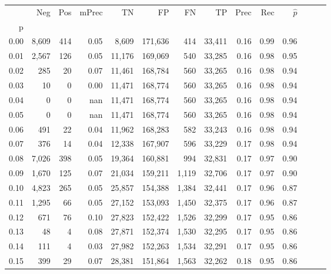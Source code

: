 \begin{tabular}{rrrrrrrrrrrrrr}
\toprule
{} &     Neg &    Pos & mPrec &       TN &       FP &      FN &      TP &  Prec &   Rec & $\hat{p}$ \\
p    &         &        &       &          &          &         &         &       &       &           \\
\midrule
0.00 &   8,609 &    414 &  0.05 &    8,609 &  171,636 &     414 &  33,411 &  0.16 &  0.99 &      0.96 \\
0.01 &   2,567 &    126 &  0.05 &   11,176 &  169,069 &     540 &  33,285 &  0.16 &  0.98 &      0.95 \\
0.02 &     285 &     20 &  0.07 &   11,461 &  168,784 &     560 &  33,265 &  0.16 &  0.98 &      0.94 \\
0.03 &      10 &      0 &  0.00 &   11,471 &  168,774 &     560 &  33,265 &  0.16 &  0.98 &      0.94 \\
0.04 &       0 &      0 &   nan &   11,471 &  168,774 &     560 &  33,265 &  0.16 &  0.98 &      0.94 \\
0.05 &       0 &      0 &   nan &   11,471 &  168,774 &     560 &  33,265 &  0.16 &  0.98 &      0.94 \\
0.06 &     491 &     22 &  0.04 &   11,962 &  168,283 &     582 &  33,243 &  0.16 &  0.98 &      0.94 \\
0.07 &     376 &     14 &  0.04 &   12,338 &  167,907 &     596 &  33,229 &  0.17 &  0.98 &      0.94 \\
0.08 &   7,026 &    398 &  0.05 &   19,364 &  160,881 &     994 &  32,831 &  0.17 &  0.97 &      0.90 \\
0.09 &   1,670 &    125 &  0.07 &   21,034 &  159,211 &   1,119 &  32,706 &  0.17 &  0.97 &      0.90 \\
0.10 &   4,823 &    265 &  0.05 &   25,857 &  154,388 &   1,384 &  32,441 &  0.17 &  0.96 &      0.87 \\
0.11 &   1,295 &     66 &  0.05 &   27,152 &  153,093 &   1,450 &  32,375 &  0.17 &  0.96 &      0.87 \\
0.12 &     671 &     76 &  0.10 &   27,823 &  152,422 &   1,526 &  32,299 &  0.17 &  0.95 &      0.86 \\
0.13 &      48 &      4 &  0.08 &   27,871 &  152,374 &   1,530 &  32,295 &  0.17 &  0.95 &      0.86 \\
0.14 &     111 &      4 &  0.03 &   27,982 &  152,263 &   1,534 &  32,291 &  0.17 &  0.95 &      0.86 \\
0.15 &     399 &     29 &  0.07 &   28,381 &  151,864 &   1,563 &  32,262 &  0.18 &  0.95 &      0.86 \\

\end{tabular}
